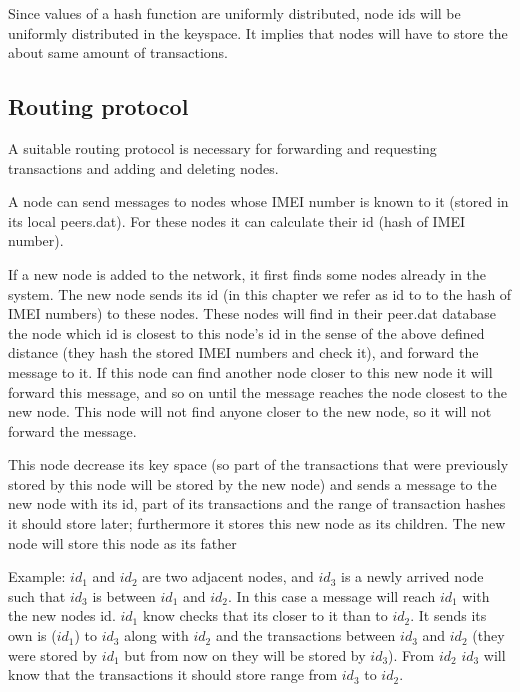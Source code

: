 \documentclass[a4paper,12pt]{article}
\begin{document}
Since values of a hash function are uniformly distributed, node ids will be uniformly distributed in the keyspace. It implies that nodes will have to store the about same amount of transactions.


\subsection{Routing protocol}

A suitable routing protocol is necessary for forwarding and requesting transactions and adding and deleting nodes.

A node can send messages to nodes whose IMEI number is known to it (stored in its local peers.dat). For these nodes it can calculate their id (hash of IMEI number).

If a new node is added to the network,  it first finds some nodes already in the system. The new node sends its id  (in this chapter we refer as id to to the hash of IMEI numbers) to these nodes. These nodes will find in their peer.dat database the node which id is closest to this node's id in the sense of the above defined distance (they hash the stored IMEI numbers and check it), and forward the message to it. If this node can find another node closer to this new node it will forward this message, and so on until the message reaches the node closest to the new node. This node will not find anyone closer to the new node, so it will not forward the message.

This node decrease its key space (so part of the transactions that were previously stored by this node will be stored by the new node) and sends a message to the new node with its id, part of its transactions and the range of transaction hashes it should store later; furthermore it stores this new node as its children. The new node will store this node as its father

Example: $id_1$ and $id_2$ are two adjacent nodes, and $id_3$ is a newly arrived node such that $id_3$ is between $id_1$ and $id_2$. In this case a message will reach $id_1$ with the new nodes id. $id_1$ know checks that its closer to it than to $id_2$. It sends its own is ($id_1$) to $id_3$ along with $id_2$ and the transactions between $id_3$ and $id_2$ (they were stored by $id_1$ but from now on they will be stored by $id_3$). From $id_2$ $id_3$ will know that the transactions it should store range from $id_3$ to $id_2$.
\end{document}

